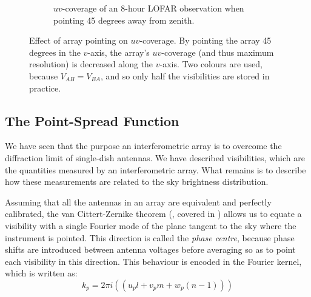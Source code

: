 \begin{figure}[ht]
\begin{subfigure}{.40\textwidth}
\caption{\label{fig.lofar.uvcoverage.elsewhere} $uv$-coverage of an 8-hour LOFAR observation when pointing 45 degrees away from zenith.}
\end{subfigure}
\caption{\label{fig.uvcoverage.lofar} Effect of array pointing on $uv$-coverage. By pointing the array 45 degrees in the $v$-axis, the array's $uv$-coverage (and thus maximum resolution) is decreased along the $v$-axis. Two colours are used, because $V_{AB}=V_{BA}$, and so only half the visibilities are stored in practice.}
\end{figure}


\subsection{The Point-Spread Function}\label{sec.imag.psf}

\pg
We have seen that the purpose an interferometric array is to overcome the diffraction limit of single-dish antennas. We have described visibilities, which are the quantities measured by an interferometric array. What remains is to describe how these measurements are related to the sky brightness distribution.

\pg
Assuming that all the antennas in an array are equivalent and perfectly calibrated, the van Cittert-Zernike theorem (, covered in ) allows us to equate a visibility with a single Fourier mode of the plane tangent to the sky where the instrument is pointed. This direction is called the \emph{phase centre}, because phase shifts are introduced between antenna voltages before averaging so as to point each visibility in this direction. This behaviour is encoded in the Fourier kernel, which is written as:
\begin{equation}
k_p=2\pi i (( u_p l + v_p m + w_p (n-1) ))
\end{equation}



